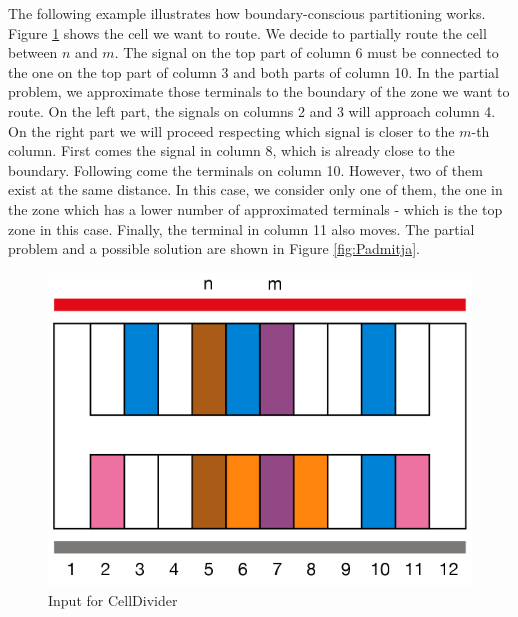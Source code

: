 \normalsize

The following example illustrates how boundary-conscious partitioning works. Figure \ref{fig:Padbuida} shows the cell we want to route. We decide to partially route the cell between $n$ and $m$. The signal on the top part of column 6 must be connected to the one on the top part of column 3 and both parts of column 10. In the partial problem, we approximate those terminals to the boundary of the zone we want to route. On the left part, the signals on columns 2 and 3 will approach column 4. On the right part we will proceed respecting which signal is closer to the $m$-th column. First comes the signal in column 8, which is already close to the boundary. Following come the terminals on column 10. However, two of them exist at the same distance. In this case, we consider only one of them, the one in the zone which has a lower number of approximated terminals - which is the top zone in this case. Finally, the terminal in column 11 also moves. The partial problem and a possible solution are shown in Figure \ref{fig:Padmitja}. \\

\begin{figure}[h!]
  \centering
  \includegraphics[scale=0.5]{img/design/Padbuida.png}
  \caption{Input for CellDivider}
  \label{fig:Padbuida}
\end{figure} 

